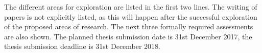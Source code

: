 \documentclass{article}
\begin{document}
The different areas for exploration are listed in the first two lines.
The writing of papers is not explicitly listed, as this will happen
after the successful exploration of the proposed areas of research.
The next three formally required assessments are also shown. The
planned thesis submission date is 31st December 2017, the thesis
submission deadline is 31st December 2018.



\end{document}
